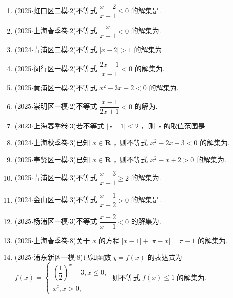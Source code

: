 \begin{enumerate}
    \item (2025$\cdot$虹口区二模$\cdot$2)不等式 $\dfrac{x - 2}{x + 1} \leq  0$ 的解集是.
    \item (2025$\cdot$上海春季卷$\cdot$2)不等式 $\dfrac{x}{x - 1} < 0$ 的解集为.
    \item (2024$\cdot$青浦区二模$\cdot$2)不等式 $\left| {x - 2}\right|  > 1$ 的解集为.
    \item (2025$\cdot$闵行区一模$\cdot$2)不等式 $\dfrac{{2x} - 1}{x - 1} < 0$ 的解集为.
    \item (2025$\cdot$黄浦区一模$\cdot$2)不等式 ${x}^{2} - {3x} + 2 < 0$ 的解集为.
    \item (2025$\cdot$崇明区一模$\cdot$2)不等式 $\dfrac{x - 1}{{2x} + 1} < 0$ 的解为.
    \item (2023$\cdot$上海春季卷$\cdot$3)若不等式 $\left| {x - 1}\right|  \leq  2$ ，则 $x$ 的取值范围是\blkda[2]{$[-1, 3]$}.
    \item (2024$\cdot$上海秋季卷$\cdot$3)已知 $x \in  \mathbf{R}$ ，则不等式 ${x}^{2} - {2x} - 3 < 0$ 的解集为.
    \item (2025$\cdot$奉贤区一模$\cdot$3)已知 $x \in  \mathbf{R}$ ，则不等式 ${x}^{2} - x + 2 > 0$ 的解集为.
    \item (2025$\cdot$青浦区一模$\cdot$3)不等式 $\dfrac{x - 3}{x + 1} \geq  2$ 的解集为.
    \item (2024$\cdot$金山区一模$\cdot$3)不等式 $\dfrac{x - 1}{x + 2} > 0$ 的解集是.
    \item (2025$\cdot$杨浦区一模$\cdot$3)不等式 $\dfrac{x + 2}{x - 1} < 0$ 的解集为.
    \item (2025$\cdot$上海春季卷$\cdot$8)关于 $x$ 的方程 $\left| {x - 1}\right|  + \left| {\pi  - x}\right|  = \pi  - 1$ 的解集为.
    \item (2025$\cdot$浦东新区一模$\cdot$8)已知函数 $y = f\left( x\right)$ 的表达式为 $f\left( x\right)  = \left\{  \begin{array}{l} {\left( \dfrac{1}{2}\right) }^{x} - 3,x \leq  0, \\  {x}^{2},x > 0, \end{array}\right.$ 则不等式 $f\left( x\right)  \leq  1$ 的解集为.

\end{enumerate}

